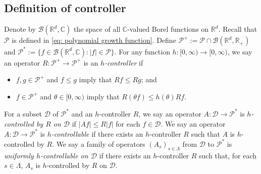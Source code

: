\documentclass[12pt,a4paper]{amsart}
\theoremstyle{plain}
\theoremstyle{definition}
\numberwithin{equation}{section}
\begin{document}
\subsection{Definition of controller}
\label{sec: controller}
	Denote by $\mathcal B(\mathbb R^d, \mathbb C)$ the space of all $\mathbb C$-valued Borel functions on $\mathbb R^d$.
	Recall that $\mathcal P$ is defined in \eqref{eq: polynomial growth function}.
    Define $\mathcal P^+:= \mathcal P \cap \mathcal B(\mathbb R^d, \mathbb R_+)$ and $\mathcal P^*:= \{f\in \mathcal B(\mathbb R^d, \mathbb C): |f|\in \mathcal P\}$.
    For any function $h: [0,\infty) \to [0,\infty)$, we say an operator $R: \mathcal P^+ \to \mathcal P^+$ is an \emph{$h$-controller} if
\begin{itemize}
\item
    $f, g\in \mathcal P^+$ and $f\leq g$ imply that $Rf \leq Rg$; and
\item
    $f \in \mathcal P^+$ and $\theta \in [0,\infty)$ imply that $ R (\theta f)\leq h(\theta) Rf$.
\end{itemize}
       For a subset $\mathcal D$ of $\mathcal P^*$ and an $h$-controller $R$, we say an operator $A : \mathcal D \to \mathcal P^*$ is \emph{$h$-controlled by $R$ on $\mathcal D$} if $|Af| \leq R|f|$ for each $f\in \mathcal D$.
    We say an operator $A : \mathcal D \to \mathcal P^*$ is \emph{$h$-controllable} if there exists an $h$-controller $R$ such that $A$ is $h$-controlled by $R$.
     We say a family of operators $(A_s)_{s\in \Lambda}$ from $\mathcal D $ to $\mathcal P^*$ is \emph{uniformly $h$-controllable on $\mathcal D$} if there exists an $h$-controller $R$ such that, for each $s\in \Lambda$, $A_s$ is $h$-controlled by $R$ on $\mathcal D$.
\end{document}
